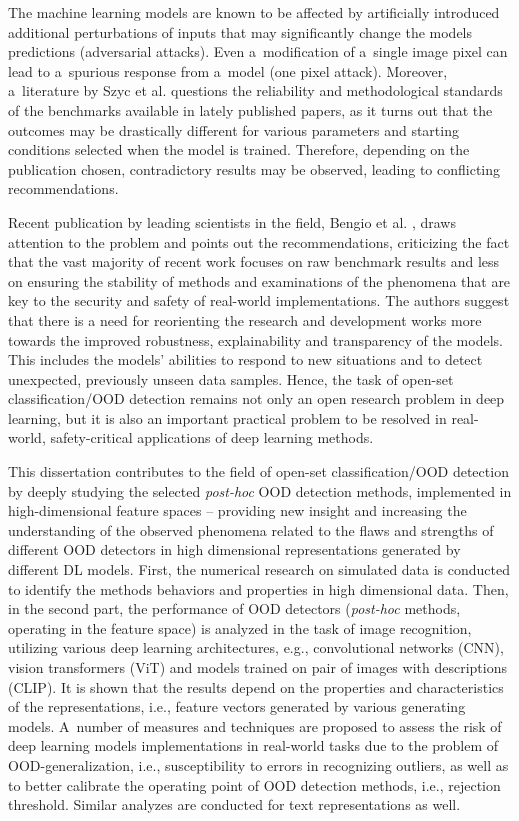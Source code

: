 The machine learning models are known to be affected by artificially introduced additional perturbations of inputs that may significantly change the models predictions \cite{Costa-2024} (adversarial attacks). Even a~modification of a~single image pixel can lead to a~spurious response from a~model \cite{Su-2019} (one pixel attack). Moreover, a~literature by Szyc et al. \cite{Szyc-2023} questions the reliability and methodological standards of the benchmarks available in lately published papers, as it turns out that the outcomes may be drastically different for various parameters and starting conditions selected when the model is trained. Therefore, depending on the publication chosen, contradictory results may be observed, leading to conflicting recommendations.

Recent publication by leading scientists in the field, Bengio et al. \cite{Bengio-2024}, draws attention to the problem and points out the recommendations, criticizing the fact that the vast majority of recent work focuses on raw benchmark results and less on ensuring the stability of methods and examinations of the phenomena that are key to the security and safety of real-world implementations. The authors suggest that there is a need for reorienting the research and development works more towards the improved robustness, explainability and transparency of the models. This includes the models' abilities to respond to new situations and to detect unexpected, previously unseen data samples. Hence, the task of open-set classification/OOD detection remains not only an open research problem in deep learning, but it is also an important practical problem to be resolved in real-world, safety-critical applications of deep learning methods.

This dissertation contributes to the field of open-set classification/OOD detection by deeply studying the selected \textit{post-hoc} OOD detection methods, implemented in high-dimensional feature spaces – providing new insight and increasing the understanding of the observed phenomena related to the flaws and strengths of different OOD detectors in high dimensional representations generated by different DL models. First, the numerical research on simulated data is conducted to identify the methods behaviors and properties in high dimensional data. Then, in the second part, the performance of OOD detectors (\textit{post-hoc} methods, operating in the feature space) is analyzed in the task of image recognition, utilizing various deep learning architectures, e.g., convolutional networks (CNN), vision transformers (ViT) and models trained on pair of images with descriptions (CLIP). It is shown that the results depend on the properties and characteristics of the representations, i.e., feature vectors generated by various generating models. A~number of measures and techniques are proposed to assess the risk of deep learning models implementations in real-world tasks due to the problem of OOD-generalization, i.e., susceptibility to errors in recognizing outliers, as well as to better calibrate the operating point of OOD detection methods, i.e., rejection threshold. Similar analyzes are conducted for text representations as well.


